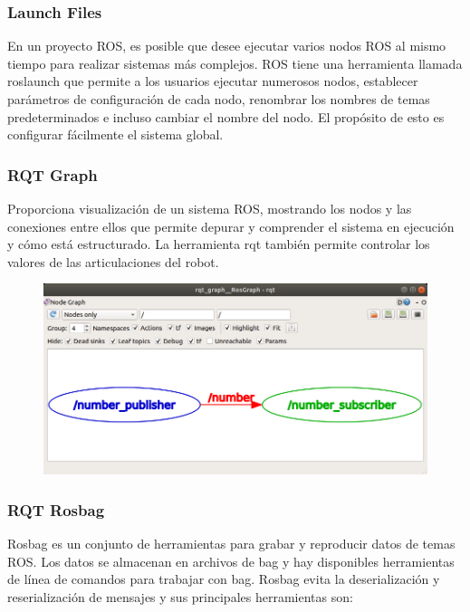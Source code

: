         \subsubsection{Launch Files}
            En un proyecto ROS, es posible que desee ejecutar varios nodos ROS al mismo tiempo para realizar sistemas más complejos. ROS tiene una herramienta llamada roslaunch que permite a los usuarios ejecutar numerosos nodos, establecer parámetros de configuración de cada nodo, renombrar los nombres de temas predeterminados e incluso cambiar el nombre del nodo. El propósito de esto es configurar fácilmente el sistema global.
            
        \subsubsection{RQT Graph}
            Proporciona visualización de un sistema ROS, mostrando los nodos y las conexiones entre ellos que permite depurar y comprender el sistema en ejecución y cómo está estructurado. La herramienta rqt también permite controlar los valores de las articulaciones del robot. 
            
            \begin{figure}[htb]
                \centering
                \includegraphics[width=1.0\linewidth]{Main/Chapter3/Images3/herramientas_1.png}
                \caption{}
                \label{f:Cap3_herramientas_1}
            \end{figure}       
            
            
    \newpage    
    
            \subsubsection{RQT Rosbag}
                Rosbag es un conjunto de herramientas para grabar y reproducir datos de temas ROS. Los datos se almacenan en archivos de bag y hay disponibles herramientas de línea de comandos para trabajar con bag. Rosbag evita la deserialización y reserialización de mensajes y sus principales herramientas son:
                
